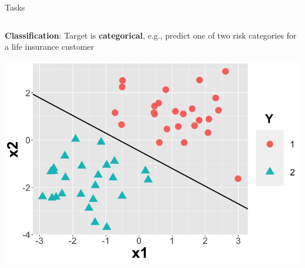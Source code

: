 \documentclass[11pt,compress,t,notes=noshow, xcolor=table]{beamer}
\begin{document}
\begin{vbframe}{Tasks}
\begin{columns}
\begin{column}{0.4\textwidth}
\small \textbf{Classification}: Target is \textbf{categorical}, e.g., predict one of two risk categories for a life insurance customer

  \begin{center}
    \includegraphics[width=\textwidth]{figure/nutshell-ml-basics-supervised-classification-task.png}
  \end{center}
\end{column}
\end{columns}

\end{vbframe}
\end{document}
